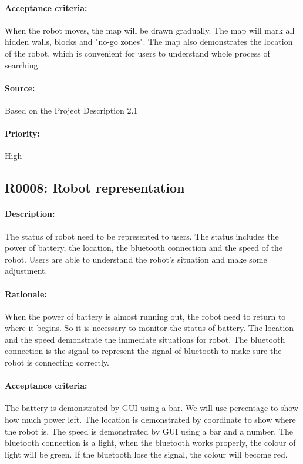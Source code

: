 \documentclass[11pt, a4paper]{report}
\begin{document}
\paragraph{Acceptance criteria:}
When the robot moves, the map will be drawn gradually. The map will mark all hidden walls, blocks and "no-go zones". The map also demonstrates the location of the robot, which is convenient for users to understand whole process of searching.
\paragraph{Source:}
Based on the Project Description 2.1
\paragraph{Priority:}
High



\subsection{R0008: Robot representation}
\paragraph{Description:}
The status of robot need to be represented to users. The status includes the power of battery, the location, the bluetooth connection and the speed of the robot. Users are able to understand the  robot's situation and make some adjustment.
\paragraph{Rationale:}
When the power of battery is almost running out, the robot need to return to where it begins. So it is necessary to monitor the status of battery. The location and the speed demonstrate the immediate situations for robot. The bluetooth connection is the signal to represent the signal of bluetooth to make sure the robot is connecting correctly.
\paragraph{Acceptance criteria:}
The battery is demonstrated by GUI using a bar. We will use percentage to show how much power left. The location is demonstrated by coordinate to show where the robot is. 
The speed is demonstrated by GUI using a bar and a number. 
The bluetooth connection is a light, when the bluetooth works properly, the colour of  light will be green. If the bluetooth lose the signal, the colour will become red.
\end{document}
